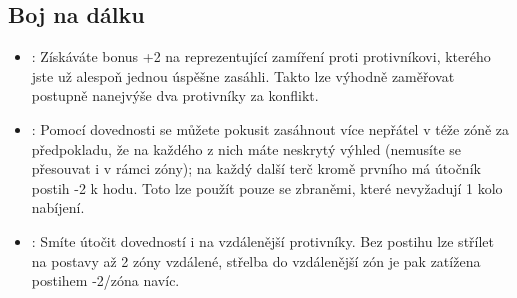 \documentclass[../main.tex]{subfiles}
\begin{document}
\subsection{Boj na dálku}
\label{sec:trik-bnd}
\begin{itemize}
\item{}:
\label{sec:bnd-odstrelovac}
Získáváte bonus +2 na  reprezentující zamíření proti protivníkovi, kterého jste už alespoň jednou úspěšne zasáhli. Takto lze výhodně zaměřovat postupně nanejvýše dva protivníky za konflikt.

\item{}:
\label{sec:bnd-mnohonasobny}
Pomocí dovednosti  se můžete pokusit zasáhnout více nepřátel v téže zóně za předpokladu, že na každého z nich máte neskrytý výhled (nemusíte se přesouvat i v rámci zóny); na každý další terč kromě prvního má útočník postih -2 k hodu. Toto lze použít pouze se zbraněmi, které nevyžadují 1 kolo nabíjení.

\item {}:
\label{sec:bnd-odstrelovac}
Smíte útočit dovedností  i na vzdálenější protivníky. Bez postihu lze střílet na postavy až 2 zóny vzdálené, střelba do vzdálenější zón je pak zatížena postihem -2/zóna navíc. 

\end{itemize}
  
\end{document}
